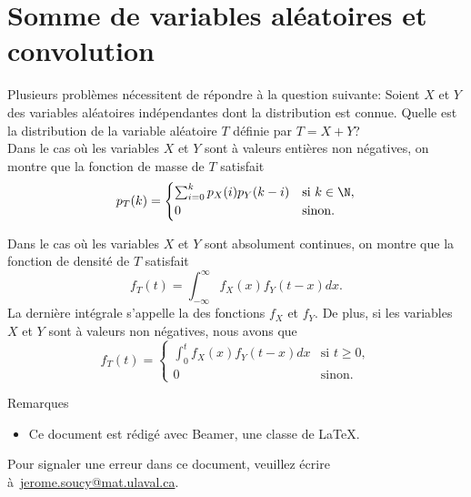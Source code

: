 \documentclass[nuit,charter,pied]{BeamerJS}
\begin{document}
\section[Somme et convolution]{Somme de variables aléatoires et convolution}
\begin{frame}[t]
	Plusieurs problèmes nécessitent de répondre à la question suivante: Soient $X$ et $Y$ des variables aléatoires indépendantes dont la distribution est connue. Quelle est la distribution de la variable aléatoire $T$ définie par $T=X+Y$?\\
	Dans le cas où les variables $X$ et $Y$ sont à valeurs entières non négatives, on montre que la fonction de masse de $T$ satisfait
	\[p_T(k)=\begin{cases}\sum_{i=0}^{k}p_X(i)p_Y(k-i)&\text{si~}k\in\N,\\
		0&\text{sinon.}\end{cases}\]
\end{frame}
\begin{frame}[t]
	Dans le cas où les variables $X$ et $Y$ sont absolument continues, on montre que la fonction de densité de $T$ satisfait
	\[f_T(t)=\int_{-\infty}^{\infty}f_X(x)f_Y(t-x)dx.\]
	La dernière intégrale s'appelle la  des fonctions $f_X$ et $f_Y$. De plus, si les variables $X$ et $Y$ sont à valeurs non négatives, nous avons que
	\[f_T(t)=\begin{cases}\int_{0}^{t}f_X(x)f_Y(t-x)dx&\text{si~}t\geq 0,\\
		0&\text{sinon.}\end{cases}\]
\end{frame}

\begin{frame}{Remarques}

 \begin{rems}
 	\begin{itemize}
 		\item Ce document est rédigé avec Beamer, une classe de \LaTeX.
 	\end{itemize}
 \end{rems}

 	\vfill
 	\footnotesize Pour signaler une erreur dans ce document, veuillez écrire à~\href{mailto:jerome.soucy@mat.ulaval.ca}{jerome.soucy@mat.ulaval.ca}.
 \end{frame}
\end{document}
